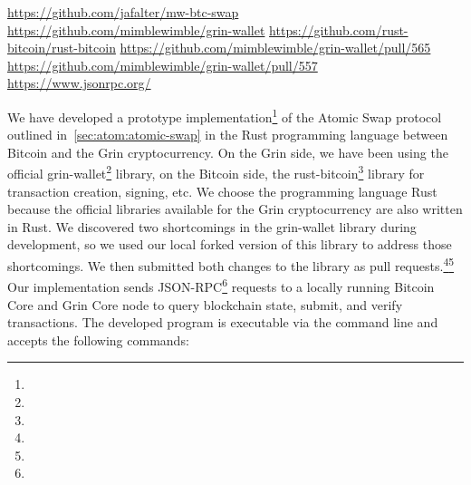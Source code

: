 \urldef\urlgithub\url{https://github.com/jafalter/mw-btc-swap}
\urldef\urlgrinwallet\url{https://github.com/mimblewimble/grin-wallet}
\urldef\urlrustbitcoin\url{https://github.com/rust-bitcoin/rust-bitcoin}
\urldef\urlprone\url{https://github.com/mimblewimble/grin-wallet/pull/565}
\urldef\urlprtwo\url{https://github.com/mimblewimble/grin-wallet/pull/557}
\urldef\urljsonrpc\url{https://www.jsonrpc.org/}

We have developed a prototype implementation\footnote{\urlgithub} of the Atomic Swap protocol outlined in~\cref{sec:atom:atomic-swap} in the Rust programming language between Bitcoin and the Grin cryptocurrency.
On the Grin side, we have been using the official grin-wallet\footnote{\urlgrinwallet} library, on the Bitcoin side, the rust-bitcoin\footnote{\urlrustbitcoin} library for transaction creation, signing, etc.
We choose the programming language Rust because the official libraries available for the Grin cryptocurrency are also written in Rust.
We discovered two shortcomings in the grin-wallet library during development, so we used our local forked version of this library to address those shortcomings.
We then submitted both changes to the library as pull requests.\footnote{\urlprone}\footnote{\urlprtwo}
Our implementation sends JSON-RPC\footnote{\urljsonrpc} requests to a locally running Bitcoin Core and Grin Core node to query blockchain state, submit, and verify transactions.
The developed program is executable via the command line and accepts the following commands:
